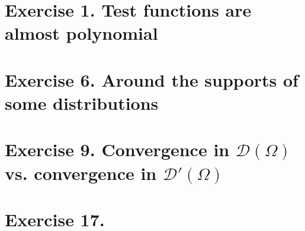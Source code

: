 \section{Exercise 1. Test functions are almost polynomial}
%
\setcounter{section}{5} 
\section{Exercise 6. Around the supports of some distributions}
%
\setcounter{section}{8} 
\section{Exercise 9. Convergence in $\mathscr{D}(\Omega)\,$ vs. convergence in $\mathscr{D}'(\Omega)\,$}
%
\setcounter{section}{16} 
\section{Exercise 17. }
%

